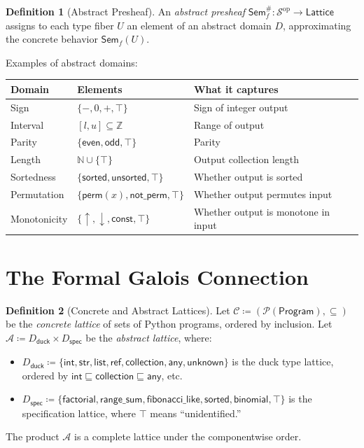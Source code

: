 \documentclass[11pt,a4paper]{report}
\theoremstyle{definition}
\newtheorem{definition}{Definition}[chapter]
\theoremstyle{plain}
\newcommand{\Nat}{\mathbb{N}}
\newcommand{\Int}{\mathbb{Z}}
\newcommand{\Sem}{\mathsf{Sem}}
\newcommand{\site}{\mathcal{S}}
\begin{document}
\begin{definition}[Abstract Presheaf]
An \emph{abstract presheaf} $\Sem_f^\# : \site^{\mathrm{op}} \to
\mathsf{Lattice}$ assigns to each type fiber $U$ an element of an
abstract domain $D$, approximating the concrete behavior
$\Sem_f(U)$.

Examples of abstract domains:
\begin{center}
\begin{tabular}{l l l}
  \textbf{Domain} & \textbf{Elements} & \textbf{What it captures} \\
  \hline
  Sign & $\{-, 0, +, \top\}$ & Sign of integer output \\
  Interval & $[l, u] \subseteq \Int$ & Range of output \\
  Parity & $\{\mathsf{even}, \mathsf{odd}, \top\}$ & Parity \\
  Length & $\Nat \cup \{\top\}$ & Output collection length \\
  Sortedness & $\{\mathsf{sorted}, \mathsf{unsorted}, \top\}$ &
    Whether output is sorted \\
  Permutation & $\{\mathsf{perm}(x), \mathsf{not\_perm}, \top\}$ &
    Whether output permutes input \\
  Monotonicity & $\{\uparrow, \downarrow, \mathsf{const}, \top\}$ &
    Whether output is monotone in input \\
\end{tabular}
\end{center}
\end{definition}

\section{The Formal Galois Connection}

\begin{definition}[Concrete and Abstract Lattices]
\label{def:concrete-abstract-lattice}
Let $\mathcal{C} \coloneqq (\mathcal{P}(\mathsf{Program}), \subseteq)$
be the \emph{concrete lattice} of sets of Python programs, ordered by
inclusion.  Let $\mathcal{A} \coloneqq D_\mathsf{duck} \times D_\mathsf{spec}$
be the \emph{abstract lattice}, where:
\begin{itemize}
  \item $D_\mathsf{duck} \coloneqq \{\mathsf{int}, \mathsf{str},
    \mathsf{list}, \mathsf{ref}, \mathsf{collection}, \mathsf{any},
    \mathsf{unknown}\}$ is the duck type lattice, ordered by
    $\mathsf{int} \sqsubseteq \mathsf{collection} \sqsubseteq
    \mathsf{any}$, etc.
  \item $D_\mathsf{spec} \coloneqq \{\mathsf{factorial},
    \mathsf{range\_sum}, \mathsf{fibonacci\_like}, \mathsf{sorted},
    \mathsf{binomial}, \top\}$ is the specification lattice, where
    $\top$ means ``unidentified.''
\end{itemize}
The product $\mathcal{A}$ is a complete lattice under the componentwise
order.
\end{definition}
\end{document}
